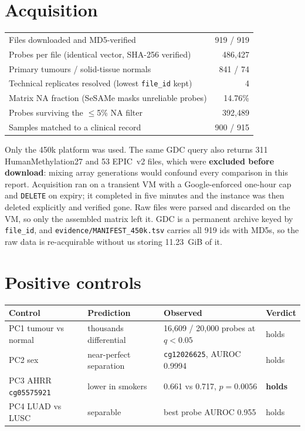 \documentclass[11pt,a4paper]{article}
\begin{document}
\section{Acquisition}

\begin{center}
\begin{tabular}{@{}lr@{}}
\toprule
Files downloaded and MD5-verified & 919 / 919 \\
Probes per file (identical vector, SHA-256 verified) & 486{,}427 \\
Primary tumours / solid-tissue normals & 841 / 74 \\
Technical replicates resolved (lowest \texttt{file\_id} kept) & 4 \\
Matrix NA fraction (SeSAMe masks unreliable probes) & 14.76\% \\
Probes surviving the $\leq$5\% NA filter & 392{,}489 \\
Samples matched to a clinical record & 900 / 915 \\
\bottomrule
\end{tabular}
\end{center}

Only the 450k platform was used. The same GDC query also returns 311 HumanMethylation27 and 53
EPIC~v2 files, which were \textbf{excluded before download}: mixing array generations would
confound every comparison in this report. Acquisition ran on a transient VM with a
Google-enforced one-hour cap and \texttt{DELETE} on expiry; it completed in five minutes and
the instance was then deleted explicitly and verified gone. Raw files were parsed and discarded
on the VM, so only the assembled matrix left it. GDC is a permanent archive keyed by
\texttt{file\_id}, and \texttt{evidence/MANIFEST\_450k.tsv} carries all 919 ids with MD5s, so
the raw data is re-acquirable without us storing 11.23~GiB of it.

\section{Positive controls}

\begin{center}
\begin{tabular}{@{}llll@{}}
\toprule
\textbf{Control} & \textbf{Prediction} & \textbf{Observed} & \textbf{Verdict} \\
\midrule
PC1 tumour vs normal & thousands differential & 16{,}609 / 20{,}000 probes at $q<0.05$ & holds \\
PC2 sex & near-perfect separation & \texttt{cg12026625}, AUROC 0.9994 & holds \\
PC3 AHRR \texttt{cg05575921} & lower in smokers & 0.661 vs 0.717, $p = 0.0056$ & \textbf{holds} \\
PC4 LUAD vs LUSC & separable & best probe AUROC 0.955 & holds \\
\bottomrule
\end{tabular}
\end{center}
\end{document}
